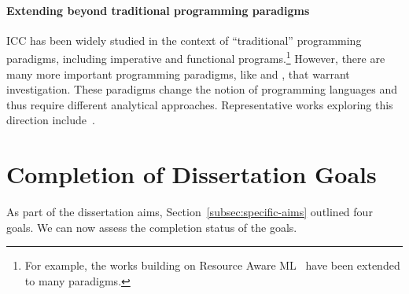 \paragraph*{Extending beyond traditional programming paradigms}
ICC has been widely studied in the context of \enquote{traditional} programming
paradigms, including imperative and functional programs.\footnote{ For example,
the works building on Resource Aware ML~\cite{hoffmann2012} have been extended
to many paradigms.} However, there are many more important programming
paradigms, like  and , that
warrant investigation. These paradigms change the notion of programming
languages and thus require different analytical approaches. Representative works
exploring this direction
include~\cite{dallago2010,avanzini2024,colledan2024,avanzini2020}.

\section{Completion of Dissertation Goals}
\label{sec:res-summary}

As part of the dissertation aims, Section~\autoref{subsec:specific-aims} outlined
four goals. We can now assess the completion status of the goals.

